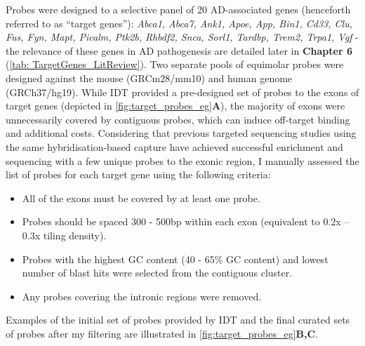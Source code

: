 
Probes were designed to a selective panel of 20 AD-associated genes (henceforth referred to as “target genes”): \textit{Abca1, Abca7, Ank1, Apoe, App, Bin1, Cd33, Clu, Fus, Fyn, Mapt, Picalm, Ptk2b, Rhbdf2, Snca, Sorl1, Tardbp, Trem2, Trpa1, Vgf} - the relevance of these genes in AD pathogenesis are detailed later in \textbf{Chapter 6} (\cref{tab: TargetGenes_LitReview}). Two separate pools of equimolar probes were designed against the mouse (GRCm28/mm10) and human genome (GRCh37/hg19). While IDT provided a pre-designed set of probes to the exons of target genes (depicted in \cref{fig:target_probes_eg}\textbf{A}), the majority of exons were unnecessarily covered by contiguous probes, which can induce off-target binding and additional costs. Considering that previous targeted sequencing studies using the same hybridisation-based capture have achieved successful enrichment and sequencing with a few unique probes to the exonic region\cite{Sheynkman2020}, I manually assessed the list of probes for each target gene using the following criteria:
\begin{itemize}
	\item All of the exons must be covered by at least one probe.
	\item Probes should be spaced 300 - 500bp within each exon (equivalent to 0.2x – 0.3x tiling density). 
	\item Probes with the highest GC content (40 - 65\% GC content) and lowest number of blast hits were selected from the contiguous cluster. 
	\item Any probes covering the intronic regions were removed.
\end{itemize}
Examples of the initial set of probes provided by IDT and the final curated sets of probes after my filtering are illustrated in  \cref{fig:target_probes_eg}\textbf{B,C}. 

